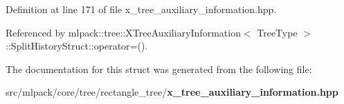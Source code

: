 Definition at line 171 of file x\+\_\+tree\+\_\+auxiliary\+\_\+information.\+hpp.



Referenced by mlpack\+::tree\+::\+X\+Tree\+Auxiliary\+Information$<$ Tree\+Type $>$\+::\+Split\+History\+Struct\+::operator=().



The documentation for this struct was generated from the following file\+:\begin{DoxyCompactItemize}
\item 
src/mlpack/core/tree/rectangle\+\_\+tree/{\bf x\+\_\+tree\+\_\+auxiliary\+\_\+information.\+hpp}\end{DoxyCompactItemize}
